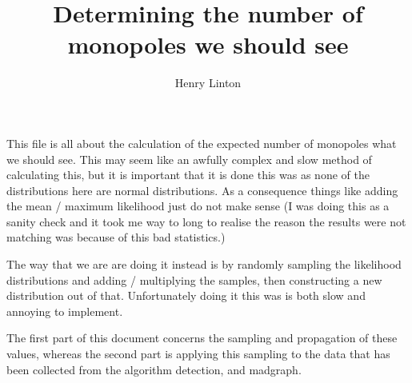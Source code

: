 \documentclass[10pt, a4paper]{article}
\title{Determining the number of monopoles we should see}
\author{Henry Linton}
\begin{document}
\maketitle

This file is all about the calculation of the expected number of monopoles what we should see.
This may seem like an awfully complex and slow method of calculating this, but it is important that it is done this was as none of the distributions here are normal distributions.
As a consequence things like adding the mean / maximum likelihood just do not make sense (I was doing this as a sanity check and it took me way to long to realise the reason the results were not matching was because of this bad statistics.)

The way that we are are doing it instead is by randomly sampling the likelihood distributions and adding / multiplying the samples, then constructing a new distribution out of that.
Unfortunately doing it this was is both slow and annoying to implement. 

The first part of this document concerns the sampling and propagation of these values, whereas the second part is applying this sampling to the data that has been collected from the algorithm detection, and madgraph. 
\end{document}
